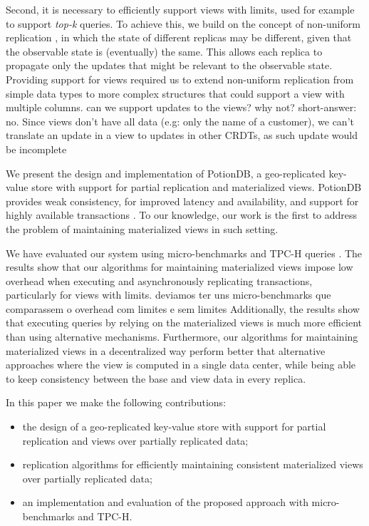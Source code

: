 \documentclass{vldb}
\newcommand{\grumbler}[2]{{\color{red}{\bf #1:} #2}}
\newcommand{\andre}[1]{\grumbler{andre}{#1}}
\newcommand{\nuno}[1]{\grumbler{nuno}{#1}}
\begin{document}
Second, it is necessary to efficiently support views with limits, used for example to support \emph{top-k} 
queries. To achieve this, we build on the concept of non-uniform replication \cite{Cabrita17Nonuniform}, in which the state
of different replicas may be different, given that the observable state is (eventually) the same.
This allows each replica to propagate only the updates that might be relevant to the observable 
state. Providing support for views required us to extend non-uniform replication from simple data 
types to more complex structures that could support a view with multiple columns.
\nuno{can we support updates to the views? why not?}
\andre{short-answer: no. Since views don't have all data (e.g: only the name of a customer), we can't translate an update in a view to updates in other CRDTs, as such update would be incomplete}

We present the design and implementation of PotionDB, a geo-replicated key-value store with support  
for partial replication and materialized views. 
PotionDB provides weak consistency, for improved latency and availability, and support for highly
available transactions \cite{hat}.  
To our knowledge, our work is the first to address the problem of maintaining materialized views
in such setting.  

We have evaluated our system using micro-benchmarks and TPC-H queries \cite{tpch}.
The results show that our algorithms for maintaining materialized views impose 
low overhead when executing and asynchronously replicating transactions, particularly
for views with limits.
\nuno{deviamos ter uns micro-benchmarks que comparassem o overhead com limites e sem limites}
Additionally, the results show that executing queries by relying on the materialized views is much more 
efficient than using alternative mechanisms.  
Furthermore, our algorithms for maintaining materialized views in a decentralized way perform better 
that alternative approaches where the view is computed in a single data center, while being
able to  keep consistency between the base and view data in every replica.

In this paper we make the following contributions:
\begin{itemize}
	\item the design of a geo-replicated key-value store  with support for partial replication
	and views over partially replicated data; 
	\item replication algorithms for efficiently maintaining consistent materialized views over 
	partially replicated data;
	 \item an implementation and evaluation of the proposed approach with micro-benchmarks
	 and TPC-H.
\end{itemize}
\end{document}
